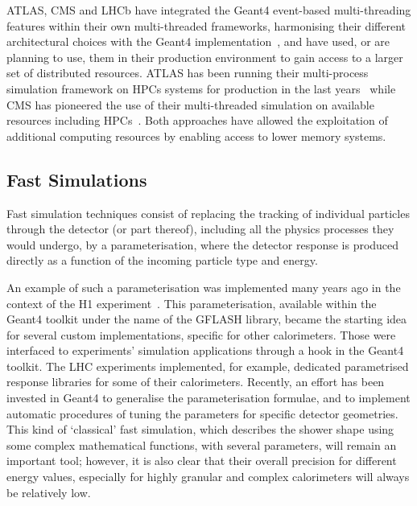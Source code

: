 ATLAS, CMS and LHCb have integrated the Geant4 event-based
multi-threading features within their own multi-threaded frameworks,
harmonising their different architectural choices with the Geant4
implementation~\cite{CMS02, LHCb01, ATLAS01}, and have used, or are planning to
use, them in their production environment to gain access to a larger set
of distributed resources. ATLAS has been running their multi-process
simulation framework on HPCs systems for production in the
last years~\cite{ATLAS02, Benjamin:2696330} 
while CMS has pioneered the use of their multi-threaded
simulation on available resources including HPCs~\cite{CMS03}. Both
approaches have allowed the exploitation of additional computing
resources by enabling access to lower memory systems.

\hypertarget{fast-simulations}{%
\subsection{Fast Simulations}\label{fast-simulations}}

Fast simulation techniques consist of replacing the
tracking of individual particles through the detector (or part thereof),
including all the physics processes they would undergo, by a
parameterisation, where the detector response is produced directly as a
function of the incoming particle type and energy.

An example of such a
parameterisation was implemented many years ago in the context of the H1
experiment~\cite{H1Gflash}. This parameterisation, available within the
Geant4 toolkit under the name of the GFLASH library, became the starting
idea for several custom implementations, specific for other
calorimeters. Those were interfaced to experiments' simulation
applications through a hook in the Geant4 toolkit. The LHC
experiments implemented, for example, dedicated parametrised response
libraries for some of their calorimeters. Recently, an effort has been
invested in Geant4 to generalise the parameterisation formulae, and to
implement automatic procedures of tuning the parameters for specific
detector geometries. This kind of `classical' fast simulation, which
describes the shower shape using some complex mathematical
functions, with several parameters, will remain an important tool;
however, it is also clear that their overall precision for different
energy values, especially for highly granular and complex calorimeters
will always be relatively low. 

